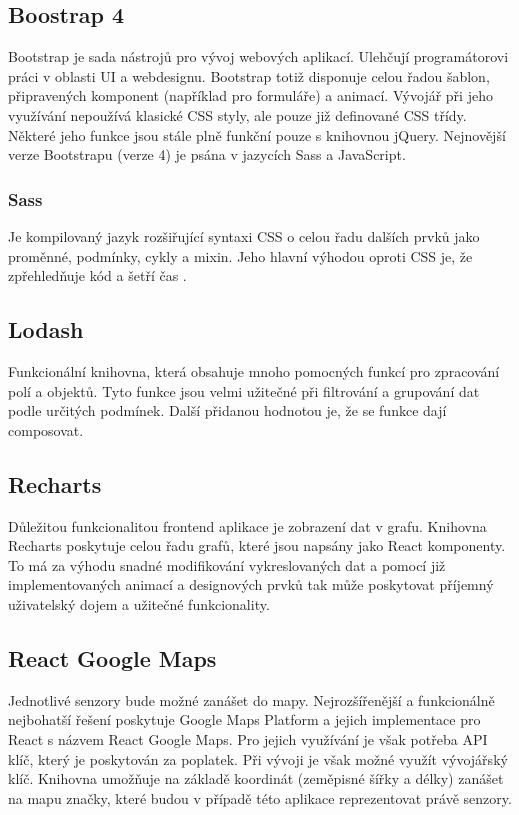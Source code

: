 \documentclass[thesis=M,czech]{FITthesis}[2018/10/20]
\begin{document}
	\subsection{Boostrap 4}
	Bootstrap je sada nástrojů pro vývoj webových aplikací. Ulehčují programátorovi práci v oblasti UI a webdesignu. Bootstrap totiž disponuje celou řadou šablon, připravených komponent (například pro formuláře) a animací. Vývojář při jeho využívání nepoužívá klasické CSS styly, ale pouze již definované CSS třídy. Některé jeho funkce jsou stále plně funkční pouze s knihovnou jQuery. Nejnovější verze Bootstrapu (verze 4) je psána v jazycích Sass a JavaScript.
	\subsubsection {Sass}
	Je kompilovaný jazyk rozšiřující syntaxi CSS o celou řadu dalších prvků jako proměnné, podmínky, cykly a mixin. Jeho hlavní výhodou oproti CSS je, že zpřehledňuje kód a šetří čas \cite{sass}.		
	\subsection{Lodash}
	Funkcionální knihovna, která obsahuje mnoho pomocných funkcí pro zpracování polí a objektů. Tyto funkce jsou velmi užitečné při filtrování a grupování dat podle určitých podmínek. Další přidanou hodnotou je, že se funkce dají composovat.
	
	\subsection{Recharts}
	Důležitou funkcionalitou frontend aplikace je zobrazení dat v grafu. Knihovna Recharts poskytuje celou řadu grafů, které jsou napsány jako React komponenty. To má za výhodu snadné modifikování vykreslovaných dat a pomocí již implementovaných animací a designových prvků tak může poskytovat příjemný uživatelský dojem a užitečné funkcionality.

	\subsection{React Google Maps}
	Jednotlivé senzory bude možné zanášet do mapy. Nejrozšířenější a funkcionálně nejbohatší řešení poskytuje Google Maps Platform \cite{google-maps-platform} a jejich implementace pro React s názvem React Google Maps. Pro jejich využívání je však potřeba API klíč, který je poskytován za poplatek. Při vývoji je však možné využít vývojářský klíč. Knihovna umožňuje na základě koordinát (zeměpisné šířky a délky) zanášet na mapu značky, které budou v případě této aplikace reprezentovat právě senzory. 
	
\end{document}
